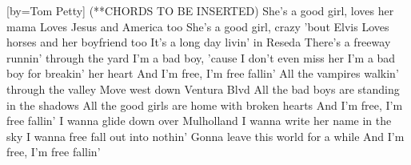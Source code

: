 [by={Tom Petty}]
\beginverse (**CHORDS TO BE INSERTED)
She's a good girl, loves her mama
Loves Jesus and America too
She's a good girl, crazy 'bout Elvis
Loves horses and her boyfriend too
\endverse
\beginverse 
It's a long day livin' in Reseda
There's a freeway runnin' through the yard
I'm a bad boy, 'cause I don't even miss her
I'm a bad boy for breakin' her heart
\endverse
\beginchorus
And I'm free, I'm free fallin'
\endchorus
\beginverse
All the vampires walkin' through the valley
Move west down Ventura Blvd
All the bad boys are standing in the shadows
All the good girls are home with broken hearts
\endverse
\beginchorus
And I'm free, I'm free fallin'
\endchorus
\beginverse
I wanna glide down over Mulholland
I wanna write her name in the sky
I wanna free fall out into nothin'
Gonna leave this world for a while
\endverse
\beginchorus
And I'm free, I'm free fallin'
\endchorus
\endsong